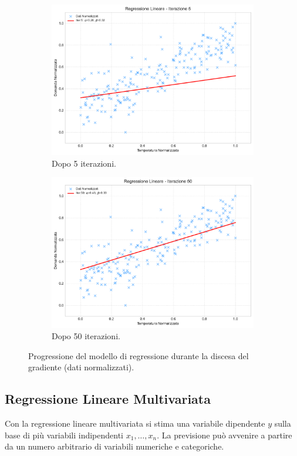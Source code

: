 \documentclass{article}
\begin{document}
\begin{figure}[H]
\begin{subfigure}[b]{0.45\textwidth}
        \centering
        \includegraphics[width=\textwidth]{images/regression_iteration_5.pdf}
        \caption{Dopo 5 iterazioni.}
    \end{subfigure}
    \hfill
    \begin{subfigure}[b]{0.45\textwidth}
        \centering
        \includegraphics[width=\textwidth]{images/regression_iteration_50.pdf}
        \caption{Dopo 50 iterazioni.}
    \end{subfigure}
    \caption{Progressione del modello di regressione durante la discesa del gradiente (dati normalizzati).}
    \label{fig:regression_progression}
\end{figure}


\subsection{Regressione Lineare Multivariata}
Con la regressione lineare multivariata si stima una variabile dipendente $y$ sulla base di più variabili indipendenti $x_1, \dots, x_n$. La previsione può avvenire a partire da un numero arbitrario di variabili numeriche e categoriche.
\end{document}
